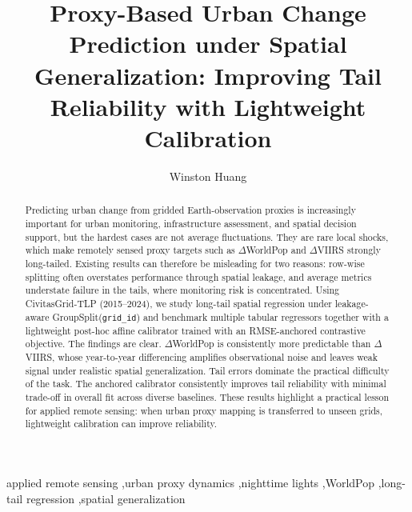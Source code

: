 \documentclass[preprint,12pt]{elsarticle}
\begin{document}
\begin{frontmatter}

\title{Proxy-Based Urban Change Prediction under Spatial Generalization: Improving Tail Reliability with Lightweight Calibration}

\author[1]{Winston Huang}




\begin{abstract}
Predicting urban change from gridded Earth-observation proxies is increasingly important for urban monitoring, infrastructure assessment, and spatial decision support, but the hardest cases are not average fluctuations. They are rare local shocks, which make remotely sensed proxy targets such as $\Delta$WorldPop and $\Delta$VIIRS strongly long-tailed. Existing results can therefore be misleading for two reasons: row-wise splitting often overstates performance through spatial leakage, and average metrics understate failure in the tails, where monitoring risk is concentrated. Using CivitasGrid-TLP (2015--2024), we study long-tail spatial regression under leakage-aware GroupSplit(\texttt{grid\_id}) and benchmark multiple tabular regressors together with a lightweight post-hoc affine calibrator trained with an RMSE-anchored contrastive objective. The findings are clear. $\Delta$WorldPop is consistently more predictable than $\Delta$VIIRS, whose year-to-year differencing amplifies observational noise and leaves weak signal under realistic spatial generalization. Tail errors dominate the practical difficulty of the task. The anchored calibrator consistently improves tail reliability with minimal trade-off in overall fit across diverse baselines. These results highlight a practical lesson for applied remote sensing: when urban proxy mapping is transferred to unseen grids, lightweight calibration can improve reliability.
\end{abstract}

\begin{keyword}
applied remote sensing \sep urban proxy dynamics \sep nighttime lights \sep WorldPop \sep long-tail regression \sep spatial generalization
\end{keyword}

\end{frontmatter}



\end{document}
